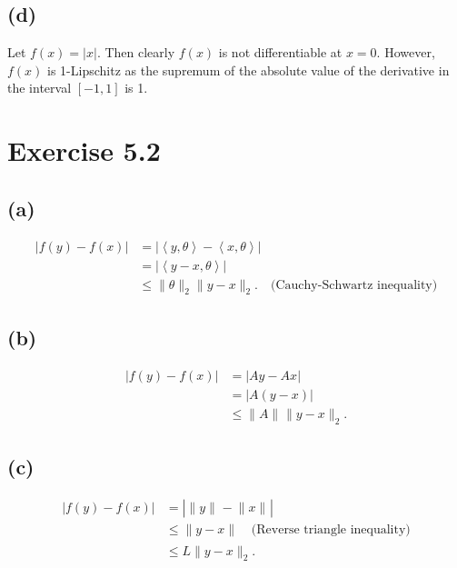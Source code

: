 \subsection*{(d)}
Let $f(x) = |x|$. Then clearly $f(x)$ is not differentiable at $x = 0$. However, $f(x)$ is 1-Lipschitz as 
the supremum of the absolute value of the derivative in the interval $[-1, 1]$ is 1.


\newpage
\section*{Exercise 5.2}
\subsection*{(a)}
\begin{align*}
	|f(y) - f(x)| 
	&= |\left\langle y, \theta \right\rangle - \left\langle x, \theta \right\rangle| \\
	&= |\left\langle y - x, \theta \right\rangle| \\
	&\leq \lVert \theta \rVert_{2} \lVert y - x \rVert_{2}. \quad \text{(Cauchy-Schwartz inequality)}
\end{align*}

\subsection*{(b)}
\begin{align*}
	|f(y) - f(x)| 
	&= |Ay - Ax| \\
	&= |A(y - x)| \\
	&\leq \lVert A \rVert_{} \lVert y - x \rVert_{2}.
\end{align*}

\subsection*{(c)}
\begin{align*}
	|f(y) - f(x)| 
	&= |\lVert y \rVert_{} - \lVert x \rVert_{}| \\
	&\leq \lVert y - x \rVert_{} \quad \text{(Reverse triangle inequality)} \\
	&\leq L \lVert y - x \rVert_{2}.
\end{align*}
